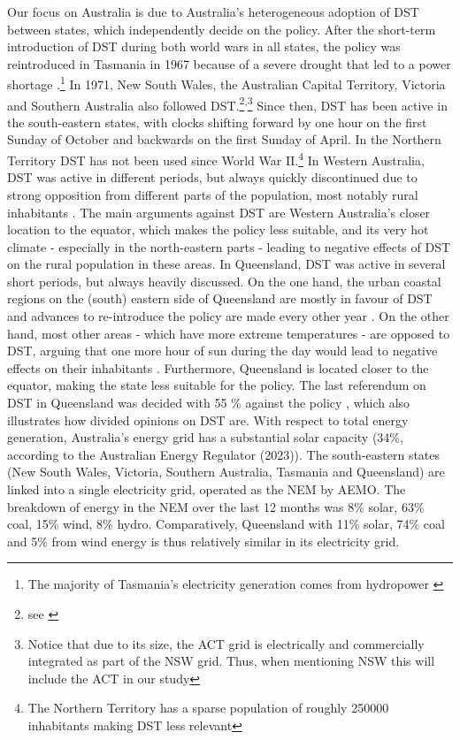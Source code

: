 Our focus on Australia is due to Australia's heterogeneous adoption of \ac{DST} between states, which independently decide on the policy. After the short-term introduction of DST during both world wars in all states, the policy was reintroduced in Tasmania in 1967 because of a severe drought that led to a power shortage \parencite{Tasmania}.\footnote{The majority of Tasmania's electricity generation comes from hydropower \parencite{aemc_tas}}
In 1971, New South Wales, the Australian Capital Territory, Victoria and Southern Australia also followed \ac{DST}.\footnote{see \cite{NewSouthWales, ACP, Victoria, SouthernAustralia}}\textsuperscript{,}\footnote{Notice that due to its size, the ACT grid is electrically and commercially integrated as part of the NSW grid. Thus, when mentioning NSW this will include the ACT in our study} Since then, \ac{DST} has been active in the south-eastern states, with clocks shifting forward by one hour on the first Sunday of October and backwards on the first Sunday of April. In the Northern Territory \ac{DST} has not been used since World War II.\footnote{The Northern Territory has a sparse population of roughly 250000 inhabitants \parencite{nt_pop} making \ac{DST} less relevant}
In Western Australia, \ac{DST} was active in different periods, but always quickly discontinued due to strong opposition from different parts of the population, most notably rural inhabitants \parencite{pearce_great_2017}. The main arguments against \ac{DST} are Western Australia's closer location to the equator, which makes the policy less suitable, and its very hot climate - especially in the north-eastern parts - leading to negative effects of \ac{DST} on the rural population in these areas.  
In Queensland, \ac{DST} was active in several short periods, but always heavily discussed. On the one hand, the urban coastal regions on the (south) eastern side of Queensland are mostly in favour of \ac{DST} and advances to re-introduce the policy are made every other year \parencite{pearce_history_2017}. On the other hand, most other areas - which have more extreme temperatures -  are opposed to \ac{DST}, arguing that one more hour of sun during the day would lead to negative effects on their inhabitants \parencite{westcott_daylight_2010}. Furthermore, Queensland is located closer to the equator, making the state less suitable for the policy. The last referendum on \ac{DST} in Queensland was decided with 55 \% against the policy \parencite{queensland_referendum}, which also illustrates how divided opinions on \ac{DST} are.  
\newline
With respect to total energy generation, Australia's energy grid has a substantial solar capacity (34\%, according to the Australian Energy Regulator (2023)\nocite{state_of_the_market}). The south-eastern states (New South Wales, Victoria, Southern Australia, Tasmania and Queensland) are linked into a single electricity grid, operated as the \ac{NEM} by \ac{AEMO}. 
The breakdown of energy in the \ac{NEM} over the last 12 months was 8\% solar, 63\% coal, 15\% wind, 8\% hydro.
Comparatively, Queensland with 11\%  solar, 74\% coal and 5\% from wind energy \parencite{aemo_fuel_mix} is thus relatively similar in its electricity grid.

